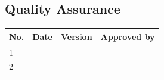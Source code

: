 \documentclass{article}
\begin{document}
\subsection[Quality Assurance]{Quality Assurance}
\begin{flushleft}
\tablefirsthead{}
\tablehead{}
\tabletail{}
\tablelasttail{}
\begin{supertabular}{|m{0.38865986in}|m{1.2011598in}|m{0.6219598in}|m{1.5656599in}|}
\hline
{ No.} &
{ Date} &
{ Version} &
{ Approved by}\\\hline
{ 1} &
 &
 &
\\\hline
{ 2} &
 &
 &
\\\hline
\end{supertabular}
\end{flushleft}
\end{document}
